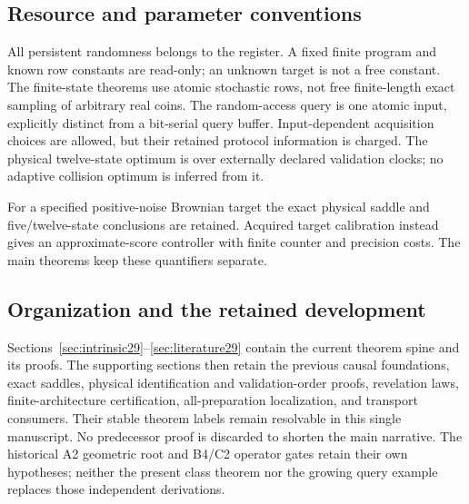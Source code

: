 \subsection{Resource and parameter conventions}
All persistent randomness belongs to the register. A fixed finite
program and known row constants are read-only; an unknown target is
not a free constant. The finite-state theorems use atomic stochastic
rows, not free finite-length exact sampling of arbitrary real coins.
The random-access query is one atomic input, explicitly distinct from
a bit-serial query buffer. Input-dependent acquisition choices are
allowed, but their retained protocol information is charged. The
physical twelve-state optimum is over externally declared validation
clocks; no adaptive collision optimum is inferred from it.

For a specified positive-noise Brownian target the exact physical saddle
and five/twelve-state conclusions are retained. Acquired target
calibration instead gives an approximate-score controller with finite
counter and precision costs. The main theorems keep these quantifiers
separate.

\subsection{Organization and the retained development}
Sections~\ref{sec:intrinsic29}--\ref{sec:literature29} contain the
current theorem spine and its proofs. The supporting sections then
retain the previous causal foundations, exact saddles, physical
identification and validation-order proofs, revelation laws,
finite-architecture certification, all-preparation localization, and
transport consumers. Their stable theorem labels remain resolvable in
this single manuscript. No predecessor proof is discarded to shorten
the main narrative. The historical A2 geometric root and B4/C2 operator
gates retain their own hypotheses; neither the present class theorem
nor the growing query example replaces those independent derivations.
